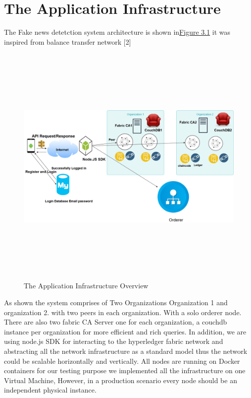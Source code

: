 \chapter{The Application Infrastructure}

The Fake news detetction system architecture is shown in\hyperref[fig:infrastructure]{Figure 3.1} it was inspired from balance transfer network [2]
 \begin{figure}[H]
\includegraphics[width=15cm,height=12cm]{images/infrastructure.png}
\caption{The Application Infrastructure Overview}
\label{fig:infrastructure}
\end{figure}
\cleardoublepage

As shown the system comprises of Two Organizations Organization 1 and organization 2. with two peers in each organization. 
With a solo orderer node.  There are also two fabric CA Server one for each organization, a couchdb instance per organization for more efficient and rich queries. 
In addition, we are using node.js SDK  for interacting to the hyperledger fabric network and abstracting all the network infrastructure as a standard model thus the network could be scalable horizontally and vertically. All nodes are running on Docker containers for our testing purpose we implemented all the infrastructure on one Virtual Machine, However, in a production scenario every node should be an independent physical instance. \\ 

